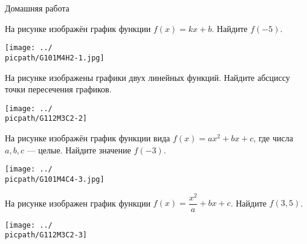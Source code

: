 
\begin{homework}[number=3]
	\begin{listofex}
		\item Домашняя работа
	\end{listofex}
\end{homework}

\begin{class}[number=4]
	\begin{listofex}
		\item 
		\begin{minipage}[t]{\bodywidth}
			На рисунке изображён график функции \(f(x)=kx+b\). Найдите \(f(-5)\).
		\end{minipage}
		\begin{minipage}[t]{\picwidth}
			\texttt{[image: ../\\picpath/G101M4H2-1.jpg]}
		\end{minipage}
		\item
		\begin{minipage}[t]{\bodywidth}
			На рисунке изображены графики двух линейных функций. Найдите абсциссу точки пересечения графиков.
		\end{minipage}
		\begin{minipage}[t]{\picwidth}
			\texttt{[image: ../\\picpath/G112M3C2-2]}
		\end{minipage}
		\item
		\begin{minipage}[t]{\bodywidth}
			На рисунке изображён график функции вида \(f(x)=ax^2+bx+c\), где числа \(a, b, c\) --- целые. Найдите значение \(f(-3)\).
		\end{minipage}
		\begin{minipage}[t]{\picwidth}
			\texttt{[image: ../\\picpath/G101M4C4-3.jpg]}
		\end{minipage}
		
		\item
		\begin{minipage}[t]{\bodywidth}
			На рисунке изображен график функции \( f(x)=\dfrac{x^2}{a}+bx+c \). Найдите \( f(3,5) \).
		\end{minipage}
		\begin{minipage}[t]{\picwidth}
			\texttt{[image: ../\\picpath/G112M3C2-3]}
		\end{minipage}
		

\end{listofex}
\end{class}
